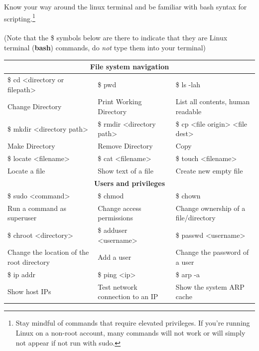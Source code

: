 \documentclass[a4paper,11pt]{article}
\renewcommand{\tt}[2][tt]{\textcolor{#1}{\ttfamily #2}}%
\begin{document}
Know your way around the linux terminal and be familiar with bash syntax for scripting.\footnote[2]{Stay mindful of commands that require elevated privileges. If you're running Linux on a non-root account, many commands will not work or will simply not appear if not run with \tt{sudo}.}
\\
\\
\tiny{(Note that the \tt{\$} symbols below are there to indicate that they are Linux terminal ({\bfseries bash}) commands, do \textit{not} type them into your terminal)}
\\
\begin{table}[h]
    \centering
    \begin{adjustbox}{width=1\textwidth}
    \begin{tabular}{|l|l|l|}
        \hline
        \multicolumn{3}{|c|}{\bf{File system navigation}}
        \\
        \hline
        \tt{\$ cd <directory or filepath>} & \tt{\$ pwd} & \tt{\$ ls -lah}
        \\
        Change Directory & Print Working Directory & List all contents, human readable
        \\
        \hline
        \tt{\$ mkdir <directory path>} & \tt{\$ rmdir <directory path>} & \tt{\$ cp <file origin> <file dest>}
        \\
        Make Directory & Remove Directory & Copy
        \\
        \hline
        \tt{\$ locate <filename>} & \tt{\$ cat <filename>} & \tt{\$ touch <filename>}
        \\
        Locate a file & Show text of a file & Create new empty file
        \\
        \hline
        \multicolumn{3}{|c|}{\bf{Users and privileges}}
        \\
        \hline
        \tt{\$ sudo <command>} & \tt{\$ chmod} & \tt{\$ chown}
        \\
        Run a command as superuser & Change access permissions & Change ownership of a file/directory
        \\
        \hline
        \tt{\$ chroot <directory>} & \tt{\$ adduser <username>} & \tt{\$ passwd <username>}
        \\
        Change the location of the root directory & Add a user & Change the password of a user
        \\
        \hline
        \tt{\$ ip addr} & \tt{\$ ping <ip>} & \tt{\$ arp -a}
        \\
        Show host IPs & Test network connection to an IP & Show the system ARP cache

\end{tabular}
\end{adjustbox}
\end{table}
\end{document}
